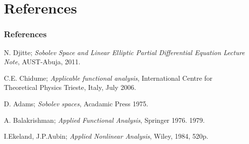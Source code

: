 \documentclass[7pt]{beamer}
\begin{document}
\section{References}
\begin{frame}
\frametitle{References}
\begin{thebibliography}{00}

 N. Djitte; 
\emph{Sobolev Space and Linear Elliptic Partial Differential Equation Lecture Note}, AUST-Abuja, 2011.



 C.E. Chidume;
\emph{Applicable functional analysis}, International Centre for Theoretical Physics
Trieste, Italy, July 2006.



 D. Adams;
\emph{Sobolev spaces}, Acadamic Press 1975.

 A. Balakrishman;
\emph{Applied Functional Analysis}, Springer 1976. 1979.


 I.Ekeland,  J.P.Aubin;
\emph{Applied Nonlinear Analysis},  Wiley, 1984, 520p.

\end{thebibliography}
\end{frame}
\end{document}
